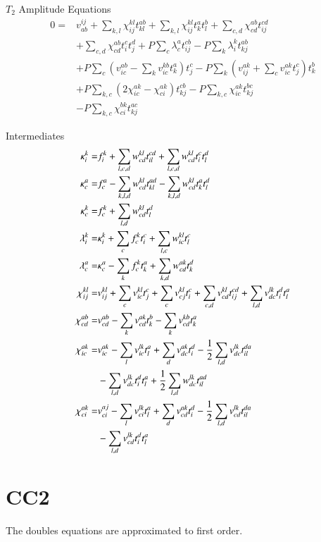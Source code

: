 \documentclass[aip,jcp,reprint,amsmath,amssymb,floatfix,citeautoscript,nofootinbib,onecolumn]{revtex4-2}
\begin{document}
$T_2$ Amplitude Equations
\begin{equation}
    \begin{aligned}
        0=&v^{ij}_{ab}+\sum_{k,l}\chi^{kl}_{ij}t^{ab}_{kl}+\sum_{k,l}\chi^{kl}_{ij}t^a_kt^b_l+\sum_{c,d}\chi^{ab}_{cd}t^{cd}_{ij}\\
        &+\sum_{c,d}\chi^{ab}_{cd}t^c_it^d_j+P\sum_c\lambda^a_ct^{cb}_{ij}-P\sum_k\lambda^k_it^{ab}_{kj}\\
        &+P\sum_c\left(v^{ab}_{ic}-\sum_kv^{kb}_{ic}t^a_k\right)t^c_j-P\sum_k\left(v^{ak}_{ij}+\sum_cv^{ak}_{ic}t^c_j\right)t^b_k\\
        &+P\sum_{k,c}\left(2\chi^{ak}_{ic}-\chi^{ak}_{ci}\right)t^{cb}_{kj}-P\sum_{k,c}\chi^{ak}_{ic}t^{bc}_{kj}\\
        &-P\sum_{k,c}\chi^{bk}_{ci}t^{ac}_{kj}
    \end{aligned}
\end{equation}

Intermediates
\begin{align}
    \kappa^k_i=&f^k_i+\sum_{l,c,d}w^{kl}_{cd}t^{cd}_{il}+\sum_{l,c,d}w^{kl}_{cd}t^c_it^d_l\\
    \kappa^a_c=&f^a_c-\sum_{k,l,d}w^{kl}_{cd}t^{ad}_{kl}-\sum_{k,l,d}w^{kl}_{cd}t^a_kt^d_l\\
    \kappa^k_c=&f^k_c+\sum_{l,d}w^{kl}_{cd}t^d_l\\
    \lambda^k_i=&\kappa^k_i+\sum_cf^k_ct^c_i+\sum_{l,c}w^{kl}_{ic}t^c_l\\
    \lambda^a_c=&\kappa^a_c-\sum_kf^k_ct^a_k+\sum_{k,d}w^{ak}_{cd}t^d_k\\
    \chi^{kl}_{ij}=&v^{kl}_{ij}+\sum_cv^{kl}_{ic}t^c_j+\sum_cv^{kl}_{cj}t^c_i+\sum_{c,d}v^{kl}_{cd}t^{cd}_{ij}+\sum_{l,d}v^{lk}_{dc}t^d_it^a_l\\
    \chi^{ab}_{cd}=&v^{ab}_{cd}-\sum_kv^{ak}_{cd}t^b_k-\sum_kv^{kb}_{cd}t^a_k\\
    \chi^{ak}_{ic}=&v^{ak}_{ic}-\sum_lv^{lk}_{ic}t^a_l+\sum_dv^{ak}_{dc}t^d_i-\frac{1}{2}\sum_{l,d}v^{lk}_{dc}t^{da}_{il}\\
        &-\sum_{l,d}v^{lk}_{dc}t^d_it^a_l+\frac{1}{2}\sum_{l,d}w^{lk}_{dc}t^{ad}_{il}\notag\\
    \chi^{ak}_{ci}=&v^{aj}_{ci}-\sum_lv^{lk}_{ci}t^a_l+\sum_dv^{ak}_{cd}t^d_i-\frac{1}{2}\sum_{l,d}v^{lk}_{cd}t^{da}_{il}\notag\\
        &-\sum_{l,d}v^{lk}_{cd}t^d_it^a_l
\end{align}

\section{CC2}
The doubles equations are approximated to first order.
\end{document}
